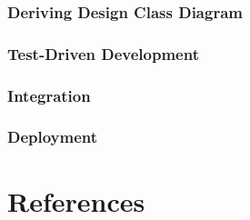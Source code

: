 \documentclass[11pt]{article}
\begin{document}
\subsubsection{Deriving Design Class Diagram}

\subsubsection{Test-Driven Development}

\subsubsection{Integration}

\subsubsection{Deployment}

\section{References}
%
%
\end{document}
